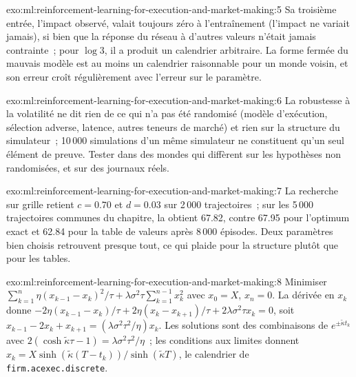 \begin{solution}{exo:ml:reinforcement-learning-for-execution-and-market-making:5}
Sa troisième entrée, l'impact observé, valait toujours zéro à l'entraînement (l'impact ne variait jamais), si bien que la réponse du réseau à
d'autres valeurs n'était jamais contrainte~; pour $\log3$, il a produit un calendrier arbitraire. La forme fermée du mauvais modèle est au
moins un calendrier raisonnable pour un monde voisin, et son erreur croît régulièrement avec l'erreur sur le paramètre.
\end{solution}

\begin{solution}{exo:ml:reinforcement-learning-for-execution-and-market-making:6}
La robustesse à la volatilité ne dit rien de ce qui n'a pas été randomisé (modèle d'exécution, sélection adverse, latence, autres teneurs de
marché) et rien sur la structure du simulateur~; 10\,000 simulations d'un même simulateur ne constituent qu'un seul élément de preuve. Tester dans des mondes
qui diffèrent sur les hypothèses non randomisées, et sur des journaux réels.
\end{solution}

\begin{solution}{exo:ml:reinforcement-learning-for-execution-and-market-making:7}
La recherche sur grille retient $c = 0.70$ et $d = 0.03$ sur 2\,000 trajectoires~; sur les 5\,000 trajectoires communes du chapitre, la 
obtient 67.82, contre 67.95 pour l'optimum exact et 62.84 pour la table de valeurs après 8\,000 épisodes.
Deux paramètres bien choisis retrouvent presque tout, ce qui plaide pour la structure plutôt que pour les tables.
\end{solution}

\begin{solution}{exo:ml:reinforcement-learning-for-execution-and-market-making:8}
Minimiser $\sum_{k=1}^n\eta(x_{k-1} - x_k)^2/\tau + \lambda\sigma^2\tau\sum_{k=1}^{n-1}x_k^2$ avec $x_0 = X$, $x_n = 0$. La
dérivée en $x_k$ donne $-2\eta(x_{k-1} - x_k)/\tau + 2\eta(x_k - x_{k+1})/\tau + 2\lambda\sigma^2\tau x_k = 0$, soit
$x_{k-1} - 2x_k + x_{k+1} = (\lambda\sigma^2\tau^2/\eta)x_k$. Les solutions sont des combinaisons de $e^{\pm\tilde\kappa t_k}$ avec
$2(\cosh\tilde\kappa\tau - 1) = \lambda\sigma^2\tau^2/\eta$~; les conditions aux limites donnent $x_k = X\sinh(\tilde\kappa(T -
t_k))/\sinh(\tilde\kappa T)$, le calendrier de \texttt{firm.acexec.discrete}.
\end{solution}

